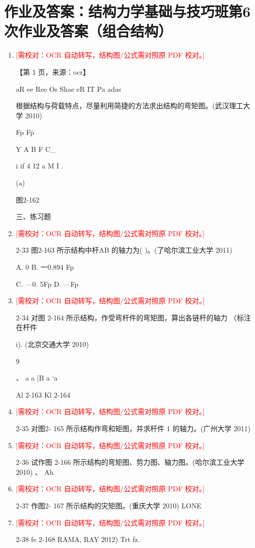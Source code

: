 \documentclass[UTF8,12pt,a4paper,openany]{ctexbook}
\newcommand{\TODO}[1]{\textcolor{red}{[需校对：#1]}}
\begin{document}
\section{作业及答案：结构力学基础与技巧班第6次作业及答案（组合结构）}
\begin{enumerate}[label=\textbf{\arabic*.},leftmargin=2em]
\item \TODO{OCR 自动转写，结构图/公式需对照原 PDF 校对。}\par 【第 1 页，来源：ocr】\par aR ee Ree Os Shae eR IT Pa adas\par 根据结构与荷载特点，尽量利用简捷的方法求出结构的弯矩图。(武汉理工大学 2010)\par Fp     Fp\par Y A   B   F   C\_\par i if 4 12 a M I  .\par (a)\par 图2-162\par 三、练习题
\item \TODO{OCR 自动转写，结构图/公式需对照原 PDF 校对。}\par 2-33 图2-163 所示结构中杆AB 的轴力为(  )。(了哈尔滨工业大学 2011)\par A. 0                        B. 一0.894 Fp\par C. —0. 5Fp                  D. —Fp
\item \TODO{OCR 自动转写，结构图/公式需对照原 PDF 校对。}\par 2-34 对图 2-164 所示结构，作受弯杆件的弯矩图，算出各链杆的轴力 〈标注在杆件\par i). (北京交通大学 2010)\par 9\par 、       a    a |B a   ‘a\par Al 2-163                                Kl 2-164
\item \TODO{OCR 自动转写，结构图/公式需对照原 PDF 校对。}\par 2-35 对图2- 165 所示结构作弯和矩图，并求杆件 1 的轴力。(广州大学 2011)
\item \TODO{OCR 自动转写，结构图/公式需对照原 PDF 校对。}\par 2-36 试作图 2-166 所示结构的弯矩图、剪力图、轴力图。(哈尔滨工业大学 2010) 、 Ah
\item \TODO{OCR 自动转写，结构图/公式需对照原 PDF 校对。}\par 2-37 作图2- 167 所示结构的灾矩图。(重庆大学 2010)                   LONE
\item \TODO{OCR 自动转写，结构图/公式需对照原 PDF 校对。}\par 2-38 fe 2-168 RAMA, RAY 2012)               Trt fz.

\end{enumerate}
\end{document}
